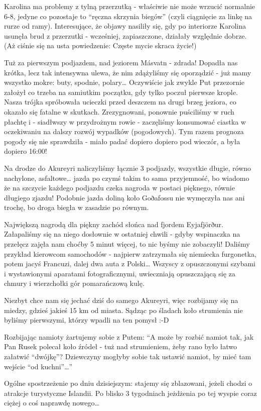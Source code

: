Karolina ma problemy z tylną przerzutką - właściwie nie może wrzucić normalnie 6-8, jedyne co pozostaje to “ręczna skrzynia biegów” (czyli ciągnięcie za linkę na rurze od ramy). Interesujące, że objawy nasiliły się, gdy po interiorze Karolina usunęła brud z przerzutki - wcześniej, zapiaszczone, działały względnie dobrze. (Aż ciśnie się na usta powiedzenie: Częste mycie skraca życie!)

Tuż za pierwszym podjazdem, nad jeziorem Másvatn - zdrada! Dopadła nas krótka, lecz tak intensywna ulewa, że nim zdążyliśmy się oporządzić - już mamy wszystko mokre: buty, spodnie, polary… Oczywiście jak zwykle Put przezornie założył co trzeba na samiutkim początku, gdy tylko poczuł pierwsze krople. Nasza trójka spróbowała ucieczki przed deszczem na drugi brzeg jeziora, co okazało się  fatalne w skutkach. Zrezygnowani, ponownie puściliśmy w ruch płachtę i - siadłwszy w przydrożnym rowie - zaczęliśmy konsumować ciastka w oczekiwaniu na dalszy rozwój wypadków (pogodowych). Tym razem prognoza pogody się nie sprawdziła - miało padać dopiero dopiero pod wieczór, a była dopiero 16:00!

Na drodze do Akureyri naliczyliśmy łącznie 3 podjazdy, wszystkie długie, równo nachylone, asfaltowe… jazda po czymś takim to sama przyjemność, bo wiadomo że na szczycie każdego podjazdu czeka nagroda w postaci pięknego, równie długiego zjazdu! Podobnie jazda doliną koło Goðafossu nie wymęczyła nas ani trochę, bo droga biegła w zasadzie po równym.

Największą nagrodą dla piękny zachód słońca nad fjordem Eyjafjörður. Załapaliśmy się na niego dosłownie w ostatniej chwili - gdyby wspinaczka na przełęcz zajęła nam choćby 5 minut więcej, to nic byśmy nie zobaczyli! Daliśmy przykład kierowcom samochodów - najpierw zatrzymała się niemiecka furgonetka, potem jacyś Francuzi, dalej dwa auta z Polski… Wszyscy z opuszczonymi szybami i wystawionymi aparatami fotograficznymi, uwieczniają opuszczającą się za chmury i wierzchołki gór pomarańczową kulę.


Niezbyt chce nam się jechać dziś do samego Akureyri, więc rozbijamy się na miedzy, gdzieś jakieś 15 km od miasta. Sądząc po śladach koło strumienia nie byliśmy pierwszymi, którzy wpadli na ten pomysł :-D

Rozbijając namioty żartujemy sobie z Putem: “A może by rozbić namiot tak, jak Pan Rusek polecał koło źródeł - tuż nad strumieniem, żeby rano było łatwo załatwić “dwójkę”? Dziewczyny mogłyby sobie tak ustawić namiot, by mieć tam wejście “od kuchni”…”


Ogólne spostrzeżenie po dniu dzisiejszym: stajemy się zblazowani, jeżeli chodzi o atrakcje turystyczne Islandii. Po blisko 3 tygodniach jeżdżenia po tej wyspie coraz ciężej o coś naprawdę nowego…
